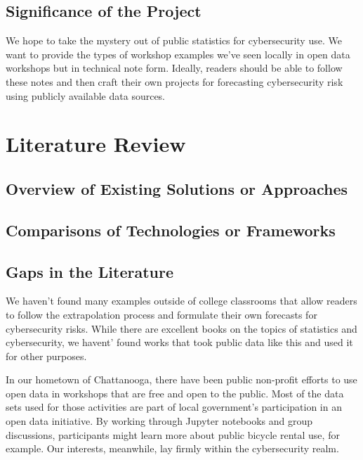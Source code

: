 \subsection{Significance of the Project}
We hope to take the mystery out of public \gls{statistics} for cybersecurity use.  We want to provide the types of workshop examples we've seen locally in open data workshops  but in technical note form.  Ideally, readers should be able to follow these notes and then craft their own projects for forecasting cybersecurity risk using publicly available data sources.
\section{Literature Review}
\subsection{Overview of Existing Solutions or Approaches}
\subsection{Comparisons of Technologies or Frameworks}
\subsection{Gaps in the Literature}
We haven't found many examples outside of college classrooms that allow readers to follow the extrapolation process and formulate their own forecasts for cybersecurity risks.  While there are excellent books on the topics of \gls{statistics} and cybersecurity, we havent' found works that took public data like this and used it for other purposes.

In our hometown of Chattanooga, there have been public non-profit efforts to use open data in workshops that are free and open to the public.  Most of the data sets used for those activities are part of local government's participation in an open data initiative.  By working through Jupyter notebooks and group discussions, participants might learn more about public bicycle rental use, for example.  Our interests, meanwhile, lay firmly within the cybersecurity realm.
